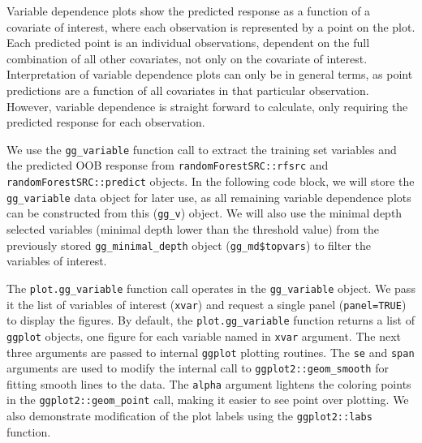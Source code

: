\documentclass[article]{jss}
\begin{document}
Variable dependence plots show the predicted response as a function of a
covariate of interest, where each observation is represented by a point
on the plot. Each predicted point is an individual observations,
dependent on the full combination of all other covariates, not only on
the covariate of interest. Interpretation of variable dependence plots
can only be in general terms, as point predictions are a function of all
covariates in that particular observation. However, variable dependence
is straight forward to calculate, only requiring the predicted response
for each observation.

We use the \texttt{gg\_variable} function call to extract the training
set variables and the predicted OOB response from
\texttt{randomForestSRC::rfsrc} and \texttt{randomForestSRC::predict}
objects. In the following code block, we will store the
\texttt{gg\_variable} data object for later use, as all remaining
variable dependence plots can be constructed from this (\texttt{gg\_v})
object. We will also use the minimal depth selected variables (minimal
depth lower than the threshold value) from the previously stored
\texttt{gg\_minimal\_depth} object (\texttt{gg\_md\$topvars}) to filter
the variables of interest.

The \texttt{plot.gg\_variable} function call operates in the
\texttt{gg\_variable} object. We pass it the list of variables of
interest (\texttt{xvar}) and request a single panel
(\texttt{panel=TRUE}) to display the figures. By default, the
\texttt{plot.gg\_variable} function returns a list of \texttt{ggplot}
objects, one figure for each variable named in \texttt{xvar} argument.
The next three arguments are passed to internal \texttt{ggplot} plotting
routines. The \texttt{se} and \texttt{span} arguments are used to modify
the internal call to \texttt{ggplot2::geom\_smooth} for fitting smooth
lines to the data. The \texttt{alpha} argument lightens the coloring
points in the \texttt{ggplot2::geom\_point} call, making it easier to
see point over plotting. We also demonstrate modification of the plot
labels using the \texttt{ggplot2::labs} function.
\end{document}
